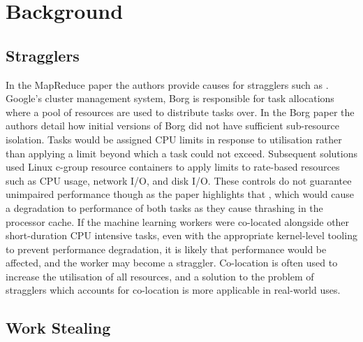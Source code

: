 \documentclass[12pt]{article}
\begin{document}
\newpage

\section{Background}

\subsection{Stragglers}

In the MapReduce paper \citep{dean2008mapreduce} the authors provide causes for stragglers such as . Google's cluster management system, Borg \cite{43438} is responsible for task allocations where a pool of resources are used to distribute tasks over. In the Borg paper the authors detail how initial versions of Borg did not have sufficient sub-resource isolation. Tasks would be assigned CPU limits in response to utilisation rather than applying a limit beyond which a task could not exceed. Subsequent solutions used Linux c-group resource containers to apply limits to rate-based resources such as CPU usage, network I/O, and disk I/O. These controls do not guarantee unimpaired performance though as the paper highlights that , which would cause a degradation to performance of both tasks as they cause thrashing in the processor cache.
\newline
\newline
If the machine learning workers were co-located alongside other short-duration CPU intensive tasks, even with the appropriate kernel-level tooling to prevent performance degradation, it is likely that performance would be affected, and the worker may become a straggler. Co-location is often used to increase the utilisation of all resources, and a solution to the problem of stragglers which accounts for co-location is more applicable in real-world uses.

\subsection{Work Stealing}
\end{document}
